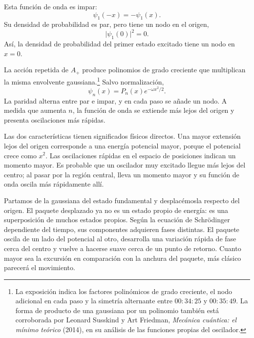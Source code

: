 Esta función de onda es impar:
\begin{equation}
\psi_{1}(-x)=-\psi_{1}(x).
\end{equation}
Su densidad de probabilidad es par, pero tiene un nodo en el origen,
\begin{equation}
\lvert\psi_{1}(0)\rvert^{2}=0.
\end{equation}
Así, la densidad de probabilidad del primer estado excitado tiene un nodo en \(x=0\).

La acción repetida de \(A_{+}\) produce polinomios de grado creciente que multiplican la misma envolvente gaussiana.\footnote{La exposición indica los factores polinómicos de grado creciente, el nodo adicional en cada paso y la simetría alternante entre \(00{:}34{:}25\) y \(00{:}35{:}49\). La forma de producto de una gaussiana por un polinomio también está corroborada por Leonard Susskind y Art Friedman, \emph{Mecánica cuántica: el mínimo teórico} (2014), en su análisis de las funciones propias del oscilador.} Salvo normalización,
\begin{equation}
\psi_{n}(x)=P_{n}(x)e^{-\omega x^{2}/2}.
\end{equation}
La paridad alterna entre par e impar, y en cada paso se añade un nodo. A medida que aumenta \(n\), la función de onda se extiende más lejos del origen y presenta oscilaciones más rápidas.

Las dos características tienen significados físicos directos. Una mayor extensión lejos del origen corresponde a una energía potencial mayor, porque el potencial crece como \(x^{2}\). Las oscilaciones rápidas en el espacio de posiciones indican un momento mayor. Es probable que un oscilador muy excitado llegue más lejos del centro; al pasar por la región central, lleva un momento mayor y su función de onda oscila más rápidamente allí.

\begin{classroomqa}
\end{classroomqa}

Partamos de la gaussiana del estado fundamental y desplacémosla respecto del origen. El paquete desplazado ya no es un estado propio de energía: es una superposición de muchos estados propios. Según la ecuación de Schr\"odinger dependiente del tiempo, sus componentes adquieren fases distintas. El paquete oscila de un lado del potencial al otro, desarrolla una variación rápida de fase cerca del centro y vuelve a hacerse suave cerca de un punto de retorno. Cuanto mayor sea la excursión en comparación con la anchura del paquete, más clásico parecerá el movimiento.

